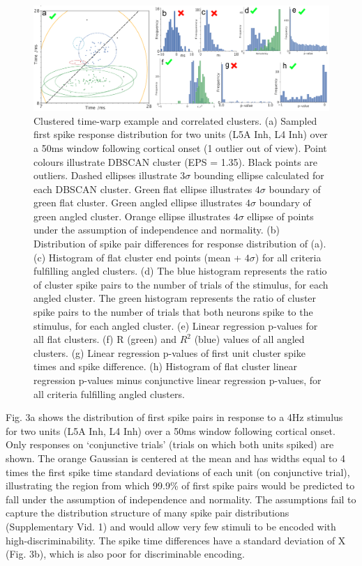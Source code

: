 \documentclass{article}
\begin{document}
\begin{figure}[t!]
\centering
\includegraphics[width=\textwidth]{Figure3.pdf}
\caption{Clustered time-warp example and correlated clusters. (a) Sampled first spike response distribution for two units (L5A Inh, L4 Inh) over a 50ms window following cortical onset (1 outlier out of view). Point colours illustrate DBSCAN cluster (EPS = 1.35). Black points are outliers. Dashed ellipses illustrate $3\sigma$ bounding ellipse calculated for each DBSCAN cluster. Green flat ellipse illustrates $4\sigma$ boundary of green flat cluster. Green angled ellipse illustrates $4\sigma$ boundary of green angled cluster. Orange ellipse illustrates $4\sigma$ ellipse of points under the assumption of independence and normality. (b) Distribution of spike pair differences for response distribution of (a). (c) Histogram of flat cluster end points (mean + $4\sigma$) for all criteria fulfilling angled clusters. (d) The blue histogram represents the ratio of cluster spike pairs to the number of trials of the stimulus, for each angled cluster. The green histogram represents the ratio of cluster spike pairs to the number of trials that both neurons spike to the stimulus, for each angled cluster. (e) Linear regression p-values for all flat clusters. (f) R (green) and $R^2$ (blue) values of all angled clusters. (g) Linear regression p-values of first unit cluster spike times and spike difference. (h) Histogram of flat cluster linear regression p-values minus conjunctive linear regression p-values, for all criteria fulfilling angled clusters.}
\label{fig:fig3}
\end{figure}

Fig. 3a shows the distribution of first spike pairs in response to a 4Hz stimulus for two units (L5A Inh, L4 Inh) over a 50ms window following cortical onset. Only responses on `conjunctive trials' (trials on which both units spiked) are shown. The orange Gaussian is centered at the mean and has widths equal to 4 times the first spike time standard deviations of each unit (on conjunctive trial), illustrating the region from which 99.9\% of first spike pairs would be predicted to fall under the assumption of independence and normality. The assumptions fail to capture the distribution structure of many spike pair distributions (Supplementary Vid. 1) and would allow very few stimuli to be encoded with high-discriminability. The spike time differences have a standard deviation of X (Fig. 3b), which is also poor for discriminable encoding. 
\end{document}

